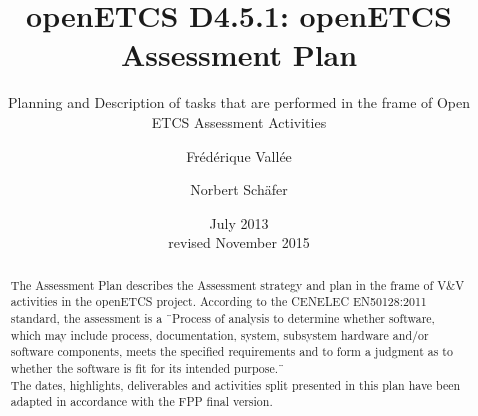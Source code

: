 \documentclass[openetcs]{template/openetcs_article}
\begin{document}
\frontmatter
{}




\title{openETCS D4.5.1: openETCS Assessment Plan}

\subtitle{Planning and Description of tasks that are performed in the frame of Open ETCS Assessment Activities}

\date{July 2013\\revised November 2015}







\author{Fr\'ed\'erique Vall\'ee}


\author{Norbert Sch\"afer}









\begin{abstract}
The Assessment Plan describes the Assessment strategy and plan in the frame of V\&V activities in the openETCS \cite{openETCS} project.
According to the CENELEC EN50128:2011 \cite{EN50128} standard, the assessment is a \"\ Process of analysis to determine whether software, which may include
process, documentation, system, subsystem hardware and/or software components, meets the specified requirements and to form a judgment as to whether the
software is fit for its intended purpose.\"\
\\
The dates, highlights, deliverables and activities split presented in this plan have been adapted in accordance with the FPP \cite{FPP} final version.
\end{abstract}
\end{document}
